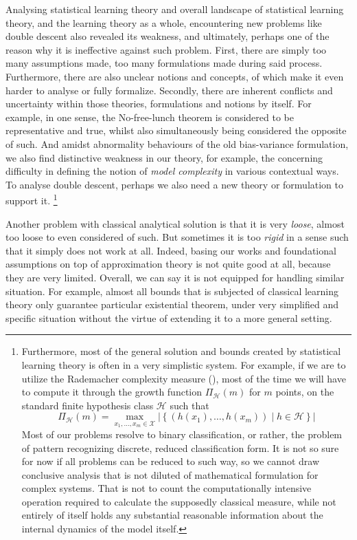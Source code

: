 \documentclass[
  journal=largetwo,
  year=2025,
  volume=37,
]{cup-journal}
\begin{document}
Analysing statistical learning theory and overall landscape of statistical learning theory, and the learning theory as a whole, encountering new problems like double descent also revealed its weakness, and ultimately, perhaps one of the reason why it is ineffective against such problem. First, there are simply too many assumptions made, too many formulations made during said process. Furthermore, there are also unclear notions and concepts, of which make it even harder to analyse or fully formalize. Secondly, there are inherent conflicts and uncertainty within those theories, formulations and notions by itself. For example, in one sense, the No-free-lunch theorem is considered to be representative and true, whilst also simultaneously being considered the opposite of such. And amidst abnormality behaviours of the old bias-variance formulation, we also find distinctive weakness in our theory, for example, the concerning difficulty in defining the notion of \textit{model complexity} in various contextual ways. To analyse double descent, perhaps we also need a new theory or formulation to support it. \footnote{Furthermore, most of the general solution and bounds created by statistical learning theory is often in a very simplistic system. For example, if we are to utilize the Rademacher complexity measure (\cite{10.5555/2371238}), most of the time we will have to compute it through the growth function $\Pi_{\mathcal{H}}(m)$ for $m$ points, on the standard finite hypothesis class $\mathcal{H}$ such that 
\begin{equation}
    \Pi_{\mathcal{H}}(m) = \max_{x_1, \dots, x_m \in \mathcal{X}} \left| \left\{ (h(x_1), \dots, h(x_m)) \mid h \in \mathcal{H} \right\} \right|
\end{equation}
Most of our problems resolve to binary classification, or rather, the problem of pattern recognizing discrete, reduced classification form. It is not so sure for now if all problems can be reduced to such way, so we cannot draw conclusive analysis that is not diluted of mathematical formulation for complex systems. That is not to count the computationally intensive operation required to calculate the supposedly classical measure, while not entirely of itself holds any substantial reasonable information about the internal dynamics of the model itself. }

Another problem with classical analytical solution is that it is very \textit{loose}, almost too loose to even considered of such. But sometimes it is too \textit{rigid} in a sense such that it simply does not work at all. Indeed, basing our works and foundational assumptions on top of approximation theory is not quite good at all, because they are very limited. Overall, we can say it is not equipped for handling similar situation. For example, almost all bounds that is subjected of classical learning theory only guarantee particular existential theorem, under very simplified and specific situation without the virtue of extending it to a more general setting. 
\end{document}
